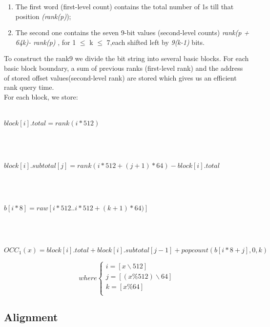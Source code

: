 \documentclass[11pt,a4paper]{report}
\begin{document}
\begin{enumerate}

	\item The first word (first-level count) contains the total number of
	 1s till that position \emph{(rank(p)});
	
	\item The second one contains the seven 9-bit values (second-level counts)
	 \emph{rank(p + 64k)- rank(p)} , for 1 $\leq$ k $\leq$ 7,each shifted left by \emph{9(k-1)} bits.
	
\end{enumerate}

To construct the rank9  we divide the bit string into several basic blocks.
For each basic block boundary, a sum of previous ranks (first-level rank) and the address of  
stored offset values(second-level rank) are stored which gives us an efficient rank query time. \\



For each block, we store:\\\\
\centerline{$ block[i].total= rank(i*512)$}\\\\
\centerline{$ block[i].subtotal[j]= rank(i*512 + (j+1)*64)-block[i].total$}\\\\
\centerline{$ b[i*8]=raw[i*512..i*512+(k+1)*64)] $}\\\\
\centerline{$ OCC_{1}(x)=block[i].total+block[i].subtotal[j-1]+popcount(b[i*8 + j],0,k)$}



\[ where
\begin{cases}
	i=[ x \backslash 512 ]\\
	j=[(x \% 512 )\backslash 64 ]\\
	k=[ x \% 64  ]\\
\end{cases}
\]


\subsection{Alignment} \label{Alignment}
\end{document}
